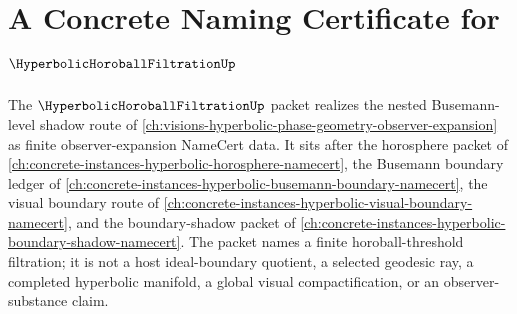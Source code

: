 \chapter{A Concrete Naming Certificate for $\HyperbolicHoroballFiltrationUp$}
\label{ch:concrete-instances-hyperbolic-horoball-filtration-namecert}

The $\HyperbolicHoroballFiltrationUp$ packet realizes the nested Busemann-level shadow route of \autoref{ch:visions-hyperbolic-phase-geometry-observer-expansion} as finite observer-expansion NameCert data. It sits after the horosphere packet of \autoref{ch:concrete-instances-hyperbolic-horosphere-namecert}, the Busemann boundary ledger of \autoref{ch:concrete-instances-hyperbolic-busemann-boundary-namecert}, the visual boundary route of \autoref{ch:concrete-instances-hyperbolic-visual-boundary-namecert}, and the boundary-shadow packet of \autoref{ch:concrete-instances-hyperbolic-boundary-shadow-namecert}. The packet names a finite horoball-threshold filtration; it is not a host ideal-boundary quotient, a selected geodesic ray, a completed hyperbolic manifold, a global visual compactification, or an observer-substance claim.

